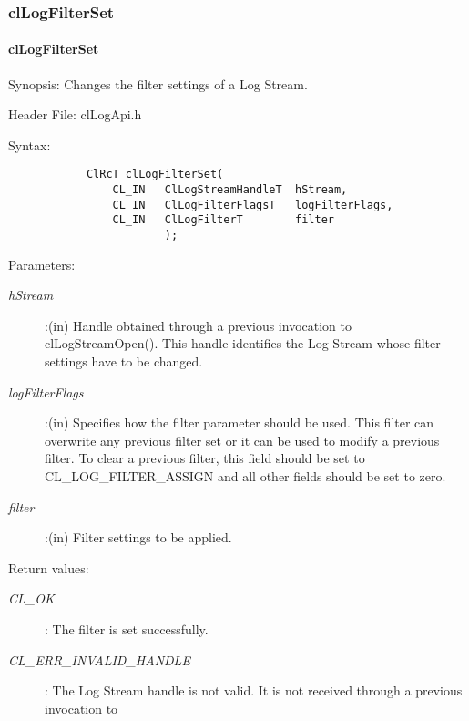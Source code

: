 \begin{flushleft}
\subsubsection{clLogFilterSet}
\hypertarget{pagelog110}{}\paragraph{cl\-Log\-Filter\-Set}\label{pagelog110}
\begin{Desc}
\item[Synopsis:]Changes the filter settings of a Log Stream.\end{Desc}
\begin{Desc}
\item[Header File:] clLogApi.h \end{Desc}
\begin{Desc}
\item[Syntax:]
\footnotesize\begin{verbatim}        	
			ClRcT clLogFilterSet(
				CL_IN	ClLogStreamHandleT	hStream,
				CL_IN	ClLogFilterFlagsT	logFilterFlags,
				CL_IN	ClLogFilterT		filter
					    );
\end{verbatim}
\normalsize
\end{Desc}
\begin{Desc}
\item[Parameters:] \begin{description}
\item[{\em hStream}]:(in) Handle obtained through a previous invocation to clLogStreamOpen(). This handle identifies the Log Stream whose filter 
settings have to be changed.
\item[{\em logFilterFlags}]:(in) Specifies how the filter parameter should be used. This filter can overwrite any previous
filter set or it can be used to modify a previous filter. To clear a previous filter, this field should be set to CL\_\-LOG\_\-FILTER\_\-ASSIGN and all other 
fields should be set to zero.
\item[{\em filter}]:(in) Filter settings to be applied.
\end{description}
\end{Desc}
\begin{Desc}
\item[Return values:]
\begin{description}
\item[{\em CL\_\-OK}]: The filter is set successfully.
\item[{\em CL\_\-ERR\_\-INVALID\_\-HANDLE}]: The Log Stream handle is not valid. It is not received through a previous invocation to 

\end{description}
\end{Desc}
\end{flushleft}
